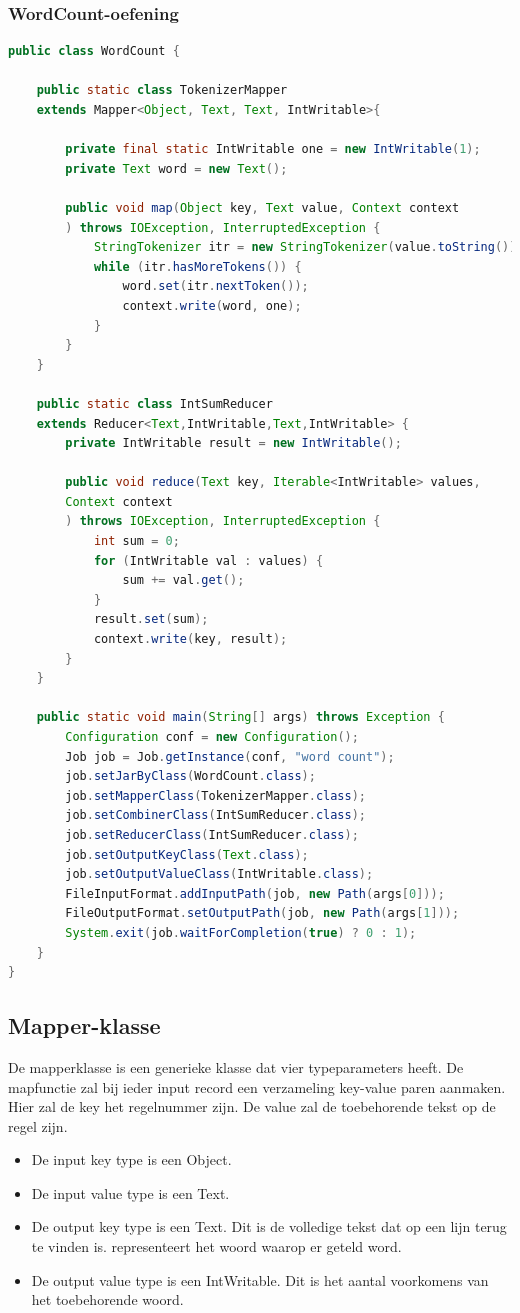 \documentclass[a4paper,10pt,twoside]{report}
\begin{document}
\subsubsection{WordCount-oefening}

\begin{lstlisting}[language=Java]
public class WordCount {
	
	public static class TokenizerMapper
	extends Mapper<Object, Text, Text, IntWritable>{
		
		private final static IntWritable one = new IntWritable(1);
		private Text word = new Text();
		
		public void map(Object key, Text value, Context context
		) throws IOException, InterruptedException {
			StringTokenizer itr = new StringTokenizer(value.toString());
			while (itr.hasMoreTokens()) {
				word.set(itr.nextToken());
				context.write(word, one);
			}
		}
	}
	
	public static class IntSumReducer
	extends Reducer<Text,IntWritable,Text,IntWritable> {
		private IntWritable result = new IntWritable();
		
		public void reduce(Text key, Iterable<IntWritable> values,
		Context context
		) throws IOException, InterruptedException {
			int sum = 0;
			for (IntWritable val : values) {
				sum += val.get();
			}
			result.set(sum);
			context.write(key, result);
		}
	}
	
	public static void main(String[] args) throws Exception {
		Configuration conf = new Configuration();
		Job job = Job.getInstance(conf, "word count");
		job.setJarByClass(WordCount.class);
		job.setMapperClass(TokenizerMapper.class);
		job.setCombinerClass(IntSumReducer.class);
		job.setReducerClass(IntSumReducer.class);
		job.setOutputKeyClass(Text.class);
		job.setOutputValueClass(IntWritable.class);
		FileInputFormat.addInputPath(job, new Path(args[0]));
		FileOutputFormat.setOutputPath(job, new Path(args[1]));
		System.exit(job.waitForCompletion(true) ? 0 : 1);
	}
}
\end{lstlisting}

\subsection{Mapper-klasse}

De mapperklasse is een generieke klasse dat vier typeparameters heeft. De mapfunctie zal bij ieder input record een verzameling key-value paren aanmaken. Hier zal de key het regelnummer zijn. De value zal de toebehorende tekst op de regel zijn.
\begin{itemize}
	\item De input key type is een Object.
	\item De input value type is een Text.
	\item De output key type is een Text. Dit is de volledige tekst dat op een lijn terug te vinden is. representeert het woord waarop er geteld word.
	\item De output value type is een IntWritable. Dit is het aantal voorkomens van het toebehorende woord.
\end{itemize}
\end{document}
